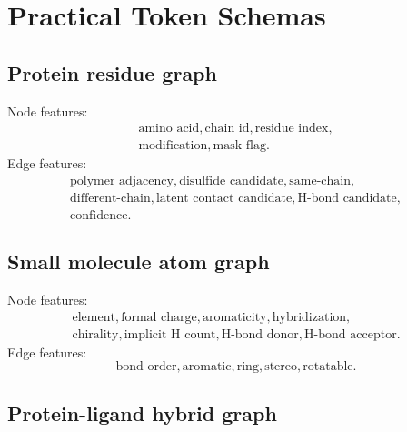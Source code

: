 \documentclass[11pt]{article}
\begin{document}
\section{Practical Token Schemas}

\subsection{Protein residue graph}

Node features:
\[
\begin{gathered}
\text{amino acid},\text{chain id},\text{residue index},\\
\text{modification},\text{mask flag}.
\end{gathered}
\]
Edge features:
\[
\begin{gathered}
\text{polymer adjacency},\text{disulfide candidate},\text{same-chain},\\
\text{different-chain},\text{latent contact candidate},
\text{H-bond candidate},\\
\text{confidence}.
\end{gathered}
\]

\subsection{Small molecule atom graph}

Node features:
\[
\begin{gathered}
\text{element},\text{formal charge},\text{aromaticity},\text{hybridization},\\
\text{chirality},\text{implicit H count},
\text{H-bond donor},\text{H-bond acceptor}.
\end{gathered}
\]
Edge features:
\[
\text{bond order},\text{aromatic},\text{ring},\text{stereo},\text{rotatable}.
\]

\subsection{Protein-ligand hybrid graph}
\end{document}
